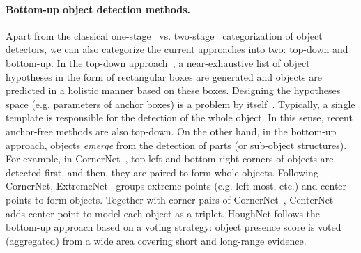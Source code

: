 \documentclass[runningheads]{llncs}
\begin{document}
\paragraph{\textbf{Bottom-up object detection methods.}}  Apart from the classical one-stage~\cite{ssd, yolo3, dssd, rrc, retinanet} vs. two-stage~\cite{faster, mask} categorization of object detectors, we can also categorize the current approaches into two: top-down and bottom-up. In the top-down approach~\cite{ssd, yolo3, retinanet, faster},  a near-exhaustive list of object hypotheses in the form of rectangular boxes are generated and objects are predicted in a  holistic manner based on these boxes. Designing the hypotheses space (e.g. parameters of anchor boxes) is a problem by itself~\cite{region_proposals}. Typically, a single template is responsible for the detection of the whole object. In this sense, recent anchor-free methods \cite{ fcos, centernet} are also top-down. On the other hand, in the bottom-up approach, objects \emph{emerge} from the detection of parts (or sub-object structures). For example, in CornerNet~\cite{cornernet}, top-left and bottom-right corners of objects are detected first, and then, they are paired to form whole objects. Following CornerNet, ExtremeNet~\cite{extremenet} groups extreme points  (e.g. left-most, etc.) and center points to form objects. Together with corner pairs of CornerNet~\cite{cornernet}, CenterNet~\cite{centernet2} adds center point to  model each object as a triplet. HoughNet follows the bottom-up approach based on a voting strategy: object presence score is voted (aggregated) from a wide area covering short and long-range evidence. 
\end{document}
